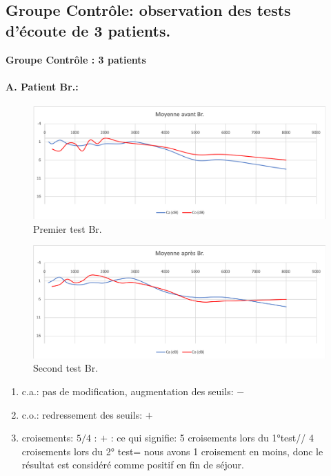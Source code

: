   \subsection{Groupe Contrôle: observation des tests d'écoute de 3 patients.}


      \textbf{Groupe Contrôle : 3 patients}
  \paragraph{ A. Patient Br.:}
  \begin{figure}[ht]
\centering
\includegraphics[width=1\linewidth]{images/graphiques/bru_pre.png}
\caption[Moyenne OG+OD]{Premier test Br.}

\end{figure}



 \begin{figure}[th]
\centering
\includegraphics[width=1\linewidth]{images/graphiques/bru_post.png}
\caption[Moyenne OG+OD]{Second test Br.}

\end{figure}

	\begin{enumerate}
 		\item  c.a.: pas de modification, augmentation des
                  seuils: $-$
 		\item  c.o.: redressement des seuils: $+$
 		\item  croisements: $5/4$ : $+$ : ce qui signifie:  5 croisements lors du 1°test// 4 croisements lors du 2° test= nous avons 1 croisement en moins, donc le résultat est considéré comme positif en fin
                  de séjour.
                \end{enumerate}

